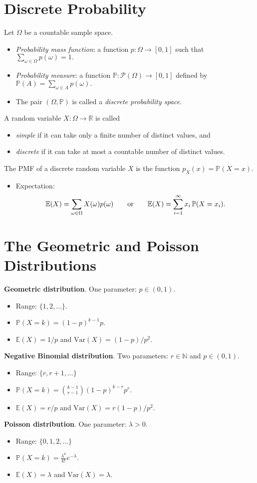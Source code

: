 \documentclass[lecture]{csm}
\newcommand{\prob}{\mathbb{P}}
\newcommand{\expe}{\mathbb{E}}
\newcommand{\var}{\text{Var}}
\newcommand{\N}{\mathbb{N}}
\newcommand{\R}{\mathbb{R}}
\def\it{\item}
\def\bit{\begin{itemize}}
\def\eit{\end{itemize}}
\begin{document}
\section{Discrete Probability}
Let $\Omega$ be a countable sample space. 
\bit
\it \emph{Probability mass function}: a function $p:\Omega\to[0,1]$ such that 
$\displaystyle\sum_{\omega\in\Omega} p(\omega) = 1.$
\it \emph{Probability measure}: a function $\prob:\mathcal{P}(\Omega)\to[0,1]$ defined by
$\displaystyle\prob(A) = \sum_{\omega\in A} p(\omega).$
\it The pair $(\Omega,\prob)$ is called a \emph{discrete probability space}.
\eit
\vspace*{1ex}
A random variable $X:\Omega\to\R$ is called
\bit
\it \emph{simple} if it can take only a finite number of distinct values, and 
\it \emph{discrete} if it can take at most a countable number of distinct values.
\eit
The PMF of a discrete random variable $X$ is the function $p_X(x)=\prob(X=x)$.
\bit
\it Expectation:
\[
\expe(X) = \displaystyle\sum_{\omega\in\Omega} X(\omega)p(\omega)
\text{\qquad or\qquad}
\expe(X) = \sum_{i=1}^{\infty} x_i\,\prob(X=x_i).
\]
\eit
\newpage
\section{The Geometric and Poisson Distributions}
\textbf{Geometric distribution}. One parameter: $p\in(0,1)$.
\bit
\it Range: $\{1,2,\ldots\}$.
\it $\prob(X=k) = (1-p)^{k-1}p$.
\it $\expe(X) = 1/p$ and $\var(X) = (1-p)/p^2$.
\eit
\vspace*{1ex}
\textbf{Negative Binomial distribution}. Two parameters: $r\in\N$ and $p\in(0,1)$.
\bit
\it Range: $\{r,r+1,\ldots\}$
\it $\prob(X=k) = \binom{k-1}{r-1}(1-p)^{k-r}p^{r}$.
\it $\expe(X) = r/p$ and $\var(X) = r(1-p)/p^2$.
\eit
\vspace*{1ex}
\textbf{Poisson distribution}. One parameter: $\lambda>0$.
\bit
\it Range: $\{0,1,2,\ldots\}$
\it $\prob(X=k) = \displaystyle\frac{\lambda^k}{k!}e^{-\lambda}$.
\it $\expe(X) = \lambda$ and $\var(X) = \lambda$.
\eit
\newpage
\end{document}
